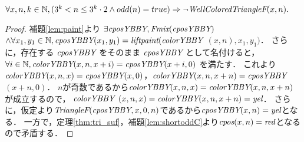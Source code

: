 \begin{lem}[\ShortOdd] \label{lem:shortodd}
  $\forall x, n, k \in \mathbb{N},
  (3^k < n \leq 3^k \cdot 2 \land odd(n) = true) \Rightarrow \lnot\textit{WellColoredTriangleF}(x,n).$
\end{lem}
\begin{proof}
  補題\ref{lem:paint}より
  $\exists \textit{cposYBBY}, \textit{Fmix}(\textit{cposYBBY})$ $ \land \forall x_1, y_1 \in \mathbb{N}, \textit{cposYBBY}(x_1,y_1) = \textit{liftpaint}(\textit{colorYBBY}$ $(x,n),x_1,y_1)$．
  さらに，存在する $\textit{cposYBBY}$ をそのまま $\textit{cposYBBY}$ として名付けると，
  $\forall i \in \mathbb{N}, \textit{colorYBBY}(x,n,x+i) = \textit{cposYBBY}(x+i,0)$ を満たす．
  これより$\textit{colorYBBY}(x,n,x) = \textit{cposYBBY}(x,0)$，$\textit{colorYBBY}(x,n,x+n) = \textit{cposYBBY}$ $(x+n,0)$．
  $n$が奇数であるから$\textit{colorYBBY}(x,n,x)=\textit{colorYBBY}(x,n,x+n)$が成立するので，
  $\textit{colorYBBY}$ $(x,n,x)=\textit{colorYBBY}(x,n,x+n)=\textit{yel}$．
  さらに，仮定より$\textit{TriangleF}(\textit{cposYBBY},x,0,n)$であるから$\textit{cposYBBY}(x,n)=\textit{yel}$となる．
  一方で，定理\ref{thm:tri_suf}，補題\ref{lem:shortoddC}より$\textit{cpos}(x,n)=\textit{red}$となるので矛盾する．
\end{proof}


